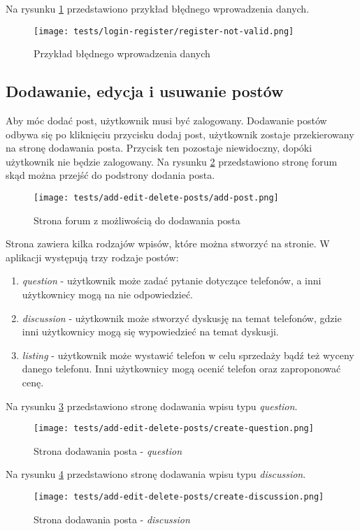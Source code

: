 Na rysunku \ref{login_error} przedstawiono przykład błędnego wprowadzenia danych.
\begin{figure}[H]
  \centering
  \texttt{[image: tests/login-register/register-not-valid.png]}
  \caption{Przykład błędnego wprowadzenia danych}
  \label{login_error}
\end{figure}

\subsection{Dodawanie, edycja i usuwanie postów}
Aby móc dodać post, użytkownik musi być zalogowany. Dodawanie postów odbywa się po kliknięciu przycisku dodaj post, użytkownik zostaje przekierowany na stronę dodawania posta. Przycisk ten pozostaje niewidoczny, dopóki użytkownik nie będzie zalogowany. Na rysunku \ref{add_post} przedstawiono stronę forum skąd można przejść do podstrony dodania posta.
\begin{figure}[H]
  \centering
  \texttt{[image: tests/add-edit-delete-posts/add-post.png]}
  \caption{Strona forum z możliwością do dodawania posta}
  \label{add_post}
\end{figure}
Strona zawiera kilka rodzajów wpisów, które można stworzyć na stronie. W aplikacji występują trzy rodzaje postów: 
\begin{enumerate}
  \item \textit{question} - użytkownik może zadać pytanie dotyczące telefonów, a inni użytkownicy mogą na nie odpowiedzieć.
  \item \textit{discussion} - użytkownik może stworzyć dyskusję na temat telefonów, gdzie inni użytkownicy mogą się wypowiedzieć na temat dyskusji.
  \item \textit{listing} - użytkownik może wystawić telefon w celu sprzedaży bądź też wyceny danego telefonu. Inni użytkownicy mogą ocenić telefon oraz zaproponować cenę.
\end{enumerate}
Na rysunku \ref{add_question_page} przedstawiono stronę dodawania wpisu typu \textit{question}.
\begin{figure}[H]
  \centering
  \texttt{[image: tests/add-edit-delete-posts/create-question.png]}
  \caption{Strona dodawania posta - \textit{question}}
  \label{add_question_page}
\end{figure}
Na rysunku \ref{add_discussion_post} przedstawiono stronę dodawania wpisu typu \textit{discussion}.
\begin{figure}[H]
  \centering
  \texttt{[image: tests/add-edit-delete-posts/create-discussion.png]}
  \caption{Strona dodawania posta - \textit{discussion}}
  \label{add_discussion_post}
\end{figure}
